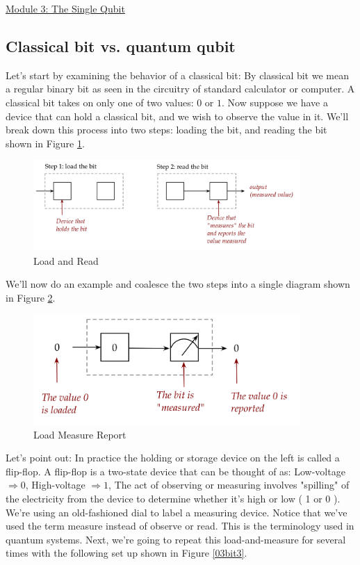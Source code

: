 \documentclass[main.tex]{subfiles}
\begin{document}
\href{https://www2.seas.gwu.edu/~simhaweb/quantum/modules/module3/module3.html}{Module 3: The Single Qubit}

\subsection{Classical bit vs. quantum qubit}

    Let's start by examining the behavior of a classical bit: By classical bit we mean a regular binary bit as seen in the circuitry of standard calculator or computer. A classical bit takes on only one of two values: 0 or $1 .$ Now suppose we have a device that can hold a classical bit, and we wish to observe the value in it. We'll break down this process into two steps: loading the bit, and reading the bit shown in Figure \ref{fig:01bit1}.
    
    \begin{figure}
        \centering
        \includegraphics[width=4in]{notes/figs/n05/01bit1.png}
        \caption{Load and Read}
        \label{fig:01bit1}
    \end{figure}
    
    We'll now do an example and coalesce the two steps into a single diagram shown in Figure \ref{fig:02bit2}.

    \begin{figure}
        \centering
        \includegraphics[width=4in]{notes/figs/n05/02bit2.png}
        \caption{Load Measure Report}
        \label{fig:02bit2}
    \end{figure}
    
    Let's point out: In practice the holding or storage device on the left is called a flip-flop. A flip-flop is a two-state device that can be thought of as: Low-voltage $\Rightarrow 0$, High-voltage $\Rightarrow 1$, The act of observing or measuring involves "spilling" of the electricity from the device to determine whether it's high or low ( 1 or 0 ). We're using an old-fashioned dial to label a measuring device. Notice that we've used the term measure instead of observe or read. This is the terminology used in quantum systems. Next, we're going to repeat this load-and-measure for several times with the following set up shown in Figure \ref{03bit3}.
    
\end{document}
